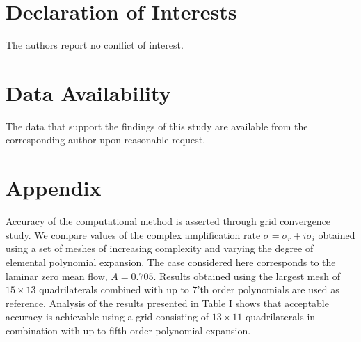 \documentclass[lineno]{jfm}
\begin{document}

\section*{Declaration of Interests}
The authors report no conflict of interest.

\section*{Data Availability}
The data that support the findings of this study are available from the corresponding author upon reasonable request.


\section*{Appendix}
\label{appendix}
Accuracy of the computational method is asserted
through grid convergence study.
We compare values of the complex amplification rate
$\sigma=\sigma_r+i\sigma_i$ obtained
using a set of meshes of increasing complexity and 
varying the degree of elemental polynomial expansion.
The case considered here corresponds to the laminar zero mean flow, $A=0.705$.
Results obtained using the largest mesh of $15\times13$
quadrilaterals combined with up to $7$'th order polynomials are used
as reference. Analysis of the results presented in Table
I shows that acceptable accuracy is achievable using a
grid consisting of $13\times11$ quadrilaterals in combination with up to fifth order
polynomial expansion.
\end{document}
